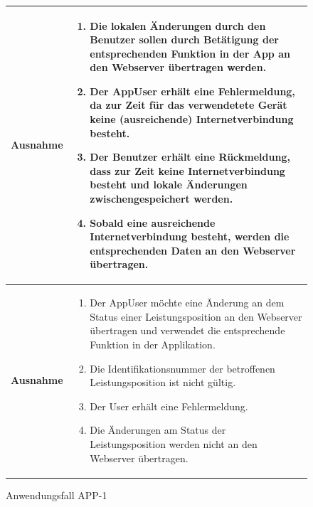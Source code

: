			\begin{figure}[h]
	\centering
	\begin{tabularx}{\textwidth}{ X | X }
					 	\textbf{Ausnahme} &
				\begin{enumerate}
					\item Die lokalen \"Anderungen durch den Benutzer sollen durch Bet\"atigung der entsprechenden Funktion in der App an den Webserver \"ubertragen werden.
					\item Der AppUser erh\"alt eine Fehlermeldung,  da zur Zeit f\"ur das verwendetete Ger\"at keine (ausreichende) Internetverbindung besteht. 
					\item Der Benutzer erh\"alt eine R\"uckmeldung,  dass zur Zeit keine Internetverbindung besteht und lokale \"Anderungen zwischengespeichert werden.
					\item Sobald eine ausreichende Internetverbindung besteht,  werden die entsprechenden Daten an den Webserver \"ubertragen.
				\end{enumerate} \\ \hline
						\textbf{Ausnahme} &
				\begin{enumerate}
					 \item Der AppUser m\"ochte eine \"Anderung an dem Status einer Leistungsposition an den Webserver \"ubertragen und verwendet die entsprechende Funktion in der Applikation. 
					 \item Die Identifikationsnummer der betroffenen Leistungsposition ist nicht g\"ultig.
					 \item Der User erh\"alt eine Fehlermeldung.
					 \item Die \"Anderungen am Status der Leistungsposition werden nicht an den Webserver \"ubertragen.
				\end{enumerate}
				 	\end{tabularx}
	\caption{Anwendungsfall APP-1}
	\label{fig:anwendungsfall-app-tabelle-APP-1-3}
\end{figure}
